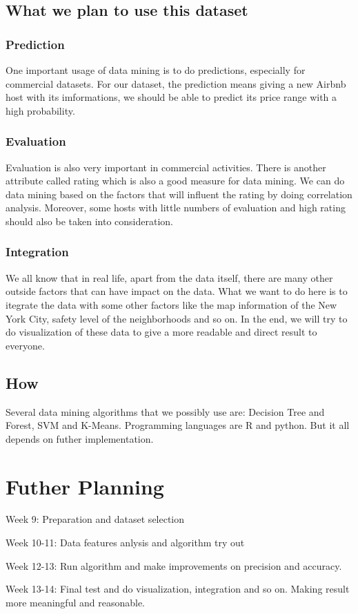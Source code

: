 \documentclass{sig-alternate}
\begin{document}
\subsection{What we plan to use this dataset}
\subsubsection{Prediction}
One important usage of data mining is to do predictions, especially for commercial
datasets. For our dataset, the prediction means giving a new Airbnb host with its imformations, 
we should be able to predict its price range with a high probability.
\subsubsection{Evaluation}
Evaluation is also very important in commercial activities. 
There is another attribute called rating which is also a good measure for data mining. 
We can do data mining based on the factors that will influent the rating by doing correlation
analysis. Moreover, some hosts with little numbers of evaluation and high rating should also be taken into consideration. 
\subsubsection{Integration}
We all know that in real life, apart from the data itself, there are many other outside factors that can 
have impact on the data. What we want to do here is to itegrate the data with some other factors
like the map information of the New York City, safety level of the neighborhoods and so on.
In the end, we will try to do visualization of these data to give a more readable and direct result to everyone.

\subsection{How}
Several data mining algorithms that we possibly use are: Decision Tree and Forest, SVM and K-Means.
Programming languages are R and python. But it all depends on futher implementation.

\section{Futher Planning}
Week 9: Preparation and dataset selection

Week 10-11: Data features anlysis and algorithm try out

Week 12-13: Run algorithm and make improvements on precision and accuracy.

Week 13-14: Final test and do visualization, integration and so on. Making result more meaningful and reasonable.
\end{document}
